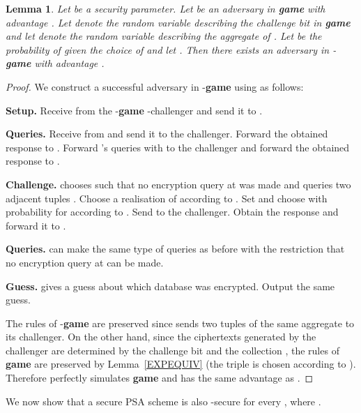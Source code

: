 \documentclass[10pt]{extarticle}
\newtheorem{Lem}[Thm]{Lemma}
\begin{document}
\begin{Lem}\label{gamezeroPone} Let  be a security parameter. Let  be an adversary in \textbf{\upshape game}  with advantage . Let  denote the random variable describing the challenge bit  in \textbf{\upshape game}  and let  denote the random variable describing the aggregate of . Let  be the probability of  given the choice of  and let . Then there exists an adversary  in -\textbf{\upshape game}  with advantage .
\end{Lem}
\begin{proof} We construct a successful adversary  in -\textbf{game}  using  as follows:
\noindent\begin{description}
 \item\textbf{Setup.} Receive  from the -\textbf{game} -challenger and send it to .
\item\textbf{Queries.} Receive  from  and send it to the challenger. Forward the obtained response  to . Forward 's queries  with  to the challenger and forward the obtained response  to .
\item\textbf{Challenge.}  chooses  such that no encryption query at  was made and queries two adjacent tuples . Choose a realisation  of  according to . Set  and choose  with probability  for  according to . Send  to the challenger. Obtain the response  and forward it to . 
\item\textbf{Queries.}  can make the same type of queries as before with the restriction that no encryption query at  can be made.
\item\textbf{Guess.}  gives a guess about which database was encrypted. Output the same guess.
\end{description}
The rules of -\textbf{game}  are preserved since  sends two tuples of the same aggregate  to its challenger. On the other hand, since the ciphertexts generated by the challenger are determined by the challenge bit and the collection , the rules of \textbf{game}  are preserved by Lemma~\ref{EXPEQUIV} (the triple  is chosen according to ). Therefore  perfectly simulates \textbf{game}  and has the same advantage as .
\end{proof}

We now show that a secure PSA scheme is also -secure for every , where .
\end{document}
